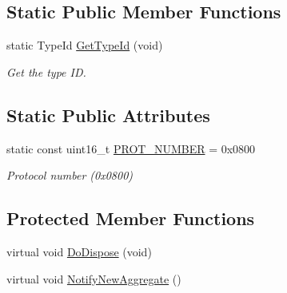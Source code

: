 \subsection*{Static Public Member Functions}
\begin{DoxyCompactItemize}
\item 
static Type\-Id \hyperlink{classns3_1_1Ipv4RouterL3Protocol_a71648ed3ff5bcca634fe8ad5bfaed3f4}{Get\-Type\-Id} (void)
\begin{DoxyCompactList}\small\item\em Get the type I\-D. \end{DoxyCompactList}\end{DoxyCompactItemize}
\subsection*{Static Public Attributes}
\begin{DoxyCompactItemize}
\item 
static const uint16\-\_\-t \hyperlink{classns3_1_1Ipv4RouterL3Protocol_a2fdda6f3cb6e421706acf29bf38e8cd4}{P\-R\-O\-T\-\_\-\-N\-U\-M\-B\-E\-R} = 0x0800
\begin{DoxyCompactList}\small\item\em Protocol number (0x0800) \end{DoxyCompactList}\end{DoxyCompactItemize}
\subsection*{Protected Member Functions}
\begin{DoxyCompactItemize}
\item 
virtual void \hyperlink{classns3_1_1Ipv4RouterL3Protocol_ab4177a69c5d6de8f7453a59edcfafe41}{Do\-Dispose} (void)
\item 
virtual void \hyperlink{classns3_1_1Ipv4RouterL3Protocol_a37e6bad738c75f2ab56badba0e544d73}{Notify\-New\-Aggregate} ()
\end{DoxyCompactItemize}
